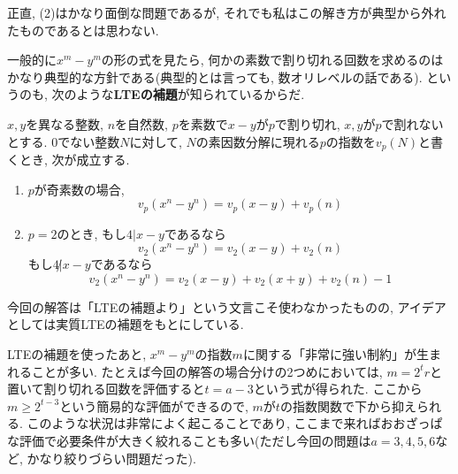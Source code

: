 正直, (2)はかなり面倒な問題であるが, それでも私はこの解き方が典型から外れたものであるとは思わない.\par 
一般的に$x^{m}-y^{m}$の形の式を見たら, 何かの素数で割り切れる回数を求めるのはかなり典型的な方針である(典型的とは言っても, 数オリレベルの話である). というのも, 次のような\textbf{LTEの補題}が知られているからだ. 
\begin{tcolorbox}[title=LTEの補題(Lifting The Exponent lemma)]
$x,y$を異なる整数, $n$を自然数, $p$を素数で$x-y$が$p$で割り切れ, $x,y$が$p$で割れないとする. 0でない整数$N$に対して, $N$の素因数分解に現れる$p$の指数を$v_{p}(N)$と書くとき, 次が成立する. 
\begin{enumerate}
\item $p$が奇素数の場合, 
\[v_p(x^{n} - y^{n}) = v_p(x-y) + v_p(n)\]
\item $p=2$のとき, もし$4|x-y$であるなら
\[v_2(x^{n} - y^{n}) = v_2(x-y) + v_2(n)\]
もし$4\not | x-y$であるなら
\[v_2(x^n - y^n) = v_2(x-y) + v_2(x+y) + v_2(n) - 1\]
\end{enumerate}
\end{tcolorbox}
今回の解答は「LTEの補題より」という文言こそ使わなかったものの, アイデアとしては実質LTEの補題をもとにしている. \par 
LTEの補題を使ったあと, $x^{m} - y^{m}$の指数$m$に関する「非常に強い制約」が生まれることが多い. たとえば今回の解答の場合分けの2つめにおいては, $m=2^{t}r$と置いて割り切れる回数を評価すると$t=a-3$という式が得られた. ここから$m \geq 2^{t-3}$という簡易的な評価ができるので, $m$が$t$の指数関数で下から抑えられる. このような状況は非常によく起こることであり, ここまで来ればおおざっぱな評価で必要条件が大きく絞れることも多い(ただし今回の問題は$a=3,4,5,6$など, かなり絞りづらい問題だった). 

